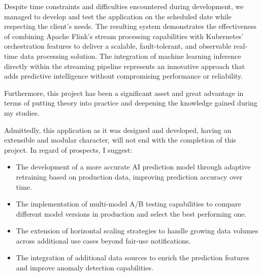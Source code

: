 Despite time constraints and difficulties encountered during development, we managed to develop and test the application on the scheduled date while respecting the client's needs. The resulting system demonstrates the effectiveness of combining Apache Flink's stream processing capabilities with Kubernetes' orchestration features to deliver a scalable, fault-tolerant, and observable real-time data processing solution. The integration of machine learning inference directly within the streaming pipeline represents an innovative approach that adds predictive intelligence without compromising performance or reliability.

Furthermore, this project has been a significant asset and great advantage in terms of putting theory into practice and deepening the knowledge gained during my studies.

Admittedly, this application as it was designed and developed, having an extensible and modular character, will not end with the completion of this project. In regard of prospects, I suggest:

\begin{itemize}
    \item[-] The development of a more accurate AI prediction model through adaptive retraining based on production data, improving prediction accuracy over time.
    \item[-] The implementation of multi-model A/B testing capabilities to compare different model versions in production and select the best performing one.
    \item[-] The extension of horizontal scaling strategies to handle growing data volumes across additional use cases beyond fair-use notifications.
    \item[-] The integration of additional data sources to enrich the prediction features and improve anomaly detection capabilities.
\end{itemize}


